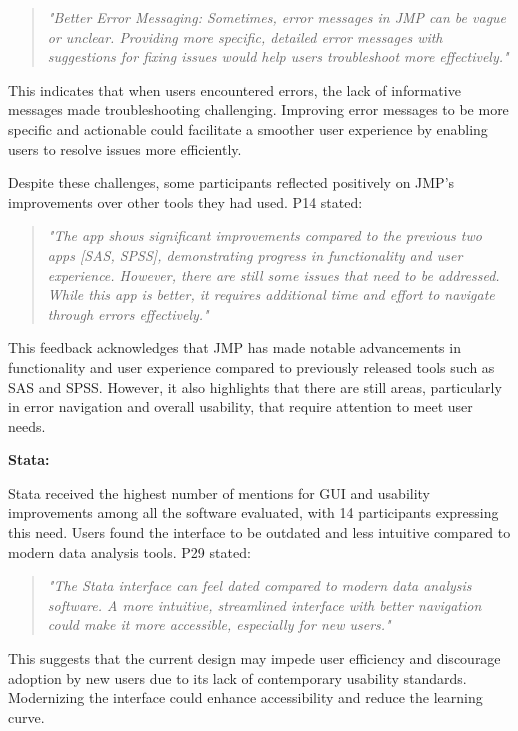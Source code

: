 \documentclass{article}
\begin{document}
\begin{quote} \emph{"Better Error Messaging: Sometimes, error messages in JMP can be vague or unclear. Providing more specific, detailed error messages with suggestions for fixing issues would help users troubleshoot more effectively." } \end{quote}

This indicates that when users encountered errors, the lack of informative messages made troubleshooting challenging. Improving error messages to be more specific and actionable could facilitate a smoother user experience by enabling users to resolve issues more efficiently.

Despite these challenges, some participants reflected positively on JMP's improvements over other tools they had used. P14 stated:

\begin{quote} \emph{"The app shows significant improvements compared to the previous two apps [SAS, SPSS], demonstrating progress in functionality and user experience. However, there are still some issues that need to be addressed. While this app is better, it requires additional time and effort to navigate through errors effectively." } \end{quote}

This feedback acknowledges that JMP has made notable advancements in functionality and user experience compared to previously released tools such as SAS and SPSS. However, it also highlights that there are still areas, particularly in error navigation and overall usability, that require attention to meet user needs.

\textbf{Stata:}

Stata received the highest number of mentions for GUI and usability improvements among all the software evaluated, with 14 participants expressing this need. Users found the interface to be outdated and less intuitive compared to modern data analysis tools. P29 stated:

\begin{quote} \emph{"The Stata interface can feel dated compared to modern data analysis software. A more intuitive, streamlined interface with better navigation could make it more accessible, especially for new users." } \end{quote}

This suggests that the current design may impede user efficiency and discourage adoption by new users due to its lack of contemporary usability standards. Modernizing the interface could enhance accessibility and reduce the learning curve.
\end{document}
